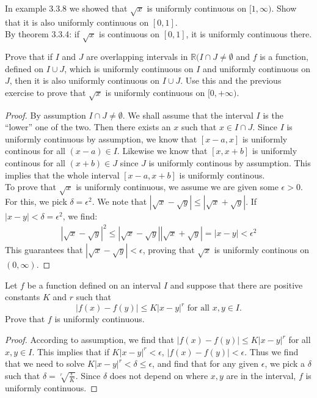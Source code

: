 \documentclass[12pt]{article}
\newcommand{\R}{\mathbb{R}}
\newenvironment{exercise}[2][Exercise]{\begin{trivlist}
\item[\hskip \labelsep {\bfseries #1}\hskip \labelsep {\bfseries #2.}]}{\end{trivlist}}
\begin{document}
\begin{exercise}{3.3.5}
    In example 3.3.8 we showed that $\sqrt{x}$ is uniformly continuous on $[1,\infty)$. Show that it is also uniformly continuous on $[0,1]$. \\
    
    By theorem 3.3.4: if $\sqrt{x}$ is continuous on $[0,1]$, it is uniformly continuous there.
\end{exercise}


\begin{exercise}{3.3.6}
Prove that if $I$ and $J$ are overlapping intervals in $\R (I \cap J \neq \emptyset$ and $f$ is a function, defined on $I \cup J$, which is uniformly continuous on $I$ and uniformly continuous on $J$, then it is also uniformly continuous on $I \cup J$. Use this and the previous exercise to prove that $\sqrt{x}$ is uniformly continuous on $[0, + \infty)$. 

	\begin{proof}
	By assumption $I \cap J \neq \emptyset$. We shall assume that the interval $I$ is the ``lower'' one of the two. Then there exists an $x$ such that $x \in I \cap J$. Since $I$ is uniformly continuous by assumption, we know that $[x-a,x]$ is uniformly continous for all $(x-a)\in I$. Likewise we know that $[x,x+b]$ is uniformly continous for all $(x+b)\in J$ since $J$ is uniformly continous by assumption. This implies that the whole interval $[x-a, x+b]$ is uniformly continous. \\
	To prove that $\sqrt{x}$ is uniformly continuous, we assume we are given some $\epsilon >0$. For this, we pick $\delta=\epsilon^2$. We note that $|\sqrt{x} - \sqrt{y}| \leq |\sqrt{x} + \sqrt{y}|$. If $|x-y|< \delta = \epsilon^2$, we find:
		\begin{align*}
		|\sqrt{x} - \sqrt{y}|^2 \leq |\sqrt{x} - \sqrt{y}| |\sqrt{x}+\sqrt{y}| = |x-y| < \epsilon^2
		\end{align*}
	This guarantees that $|\sqrt{x} - \sqrt{y}|<\epsilon$, proving that $\sqrt{x}$ is uniformly continous on $(0,\infty)$.
	\end{proof}
\end{exercise}



\begin{exercise}{3.3.8}
Let $f$ be a function defined on an interval $I$ and suppose that there are positive constants $K$ and $r$ such that 
	\[ |f(x)-f(y)| \leq K |x-y|^r \text{ for all } x,y \in I. \]
Prove that $f$ is uniformly continuous.

	\begin{proof}
	According to assumption, we find that $|f(x)-f(y)| \leq K |x-y|^r$ for all $x,y \in I$. This implies that if $K | x-y|^r < \epsilon$, $|f(x)-f(y)|<\epsilon$. Thus we find that we need to solve $K |x-y|^r < \delta \leq \epsilon$, and find that for any given $\epsilon$, we pick a $\delta$ such that $\delta = \sqrt[r]{\frac{\epsilon}{K}}$. Since $\delta$ does not depend on where $x,y$ are in the interval, $f$ is uniformly continuous.
	\end{proof}
\end{exercise}
\end{document}
